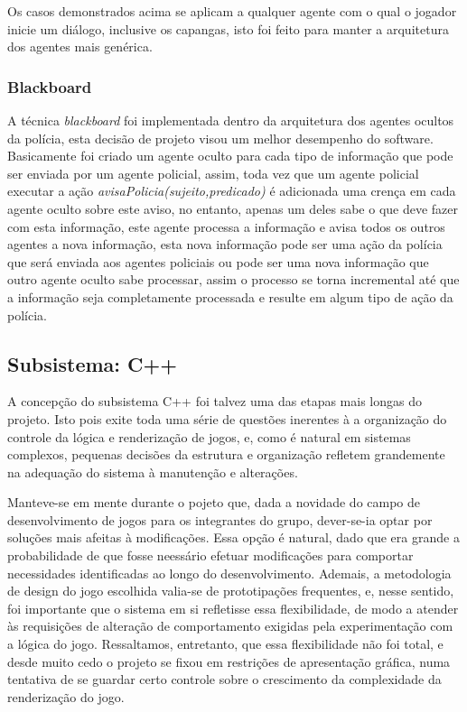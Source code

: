 Os casos demonstrados acima se aplicam a qualquer agente com o qual o jogador inicie um diálogo, inclusive os capangas, isto foi feito para manter a arquitetura dos agentes mais genérica.

\subsubsection{Blackboard}

A técnica \emph{blackboard} foi implementada dentro da arquitetura dos agentes ocultos da polícia, esta decisão de projeto visou um melhor desempenho do software.
Basicamente foi criado um agente oculto para cada tipo de informação que pode ser enviada por um agente policial, assim, toda vez que um agente policial executar a ação \emph{avisaPolicia(sujeito,predicado)} é adicionada uma crença em cada agente oculto sobre este aviso, no entanto, apenas um deles sabe o que deve fazer com esta informação, este agente processa a informação e avisa todos os outros agentes a nova informação, esta nova informação pode ser uma ação da polícia que será enviada aos agentes policiais ou pode ser uma nova informação que outro agente oculto sabe processar, assim o processo se torna incremental até que a informação seja completamente processada e resulte em algum tipo de ação da polícia.


\subsection{Subsistema: C++}

A concepção do subsistema C++ foi talvez uma das etapas mais longas do
projeto. Isto pois exite toda uma série de questões inerentes à a organização
do controle da lógica e renderização de jogos, e, como é natural em
sistemas complexos, pequenas decisões da estrutura e organização
refletem grandemente na adequação do sistema à manutenção e
alterações.

Manteve-se em mente durante o pojeto que, dada a novidade do campo de
desenvolvimento de jogos para os integrantes do grupo, dever-se-ia
optar por soluções mais afeitas à modificações. Essa opção é natural,
dado que era grande a probabilidade de que fosse neessário efetuar
modificações para comportar necessidades identificadas ao longo do
desenvolvimento. Ademais, a metodologia de design do jogo escolhida
valia-se de prototipações frequentes, e, nesse sentido, foi importante
que o sistema em si refletisse essa flexibilidade, de modo a atender
às requisições de alteração de comportamento exigidas pela
experimentação com a lógica do jogo. Ressaltamos, entretanto, que essa
flexibilidade não foi total, e desde muito cedo o projeto se fixou em
restrições de apresentação gráfica, numa tentativa de se guardar certo
controle sobre o crescimento da complexidade da renderização do jogo.

